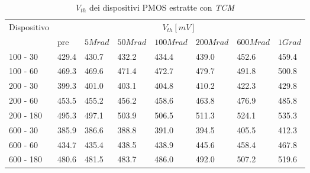 \documentclass[12pt, letterpaper]{book}
\begin{document}
\begin{table}[H]
  \renewcommand{\arraystretch}{1.3}
  \begin{tabular}{m{2cm} m{0.8cm} m{1.1cm} m{1.3cm} m{1.5cm} m{1.5cm} m{1.5cm} m{1cm}}
    \toprule
    \multirow{2}{*}{Dispositivo} & \multicolumn{7}{c}{$V_{th} [mV] $}                                                                    \\
    \cmidrule{2-8}
                                 & pre                                & $5Mrad$ & $50Mrad$ & $100Mrad$ & $200Mrad$ & $600Mrad$ & $1Grad$ \\
    \midrule
    100 - 30                     & 429.4                              & 430.7   & 432.2    & 434.4     & 439.0     & 452.6     & 459.4   \\
    \hline
    100 - 60                     & 469.3                              & 469.6   & 471.4    & 472.7     & 479.7     & 491.8     & 500.8   \\
    \hline
    200 - 30                     & 399.3                              & 401.0   & 403.1    & 404.8     & 410.2     & 422.3     & 429.8   \\
    \hline
    200 - 60                     & 453.5                              & 455.2   & 456.2    & 458.6     & 463.8     & 476.9     & 485.8   \\
    \hline
    200 - 180                    & 495.3                              & 497.1   & 503.9    & 506.5     & 511.3     & 524.1     & 535.3   \\
    \hline
    600 - 30                     & 385.9                              & 386.6   & 388.8    & 391.0     & 394.5     & 405.5     & 412.3   \\
    \hline
    600 - 60                     & 434.7                              & 435.4   & 438.5    & 438.9     & 445.6     & 458.4     & 467.8   \\
    \hline
    600 - 180                    & 480.6                              & 481.5   & 483.7    & 486.0     & 492.0     & 507.2     & 519.6   \\
    \bottomrule
  \end{tabular}
  \caption{$V_{th}$ dei dispositivi PMOS estratte con \emph{TCM}}
  \label{tab:VthTCMP}
\end{table}
\end{document}
